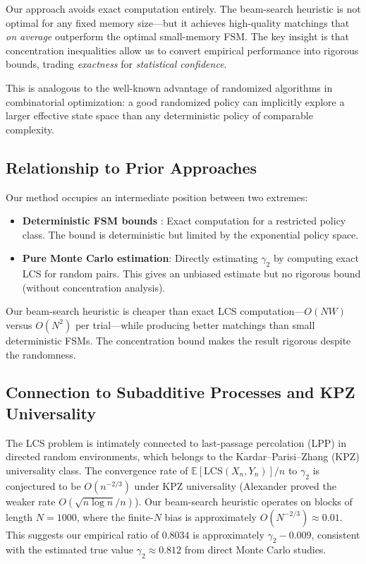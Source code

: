 \documentclass[11pt,a4paper]{article}
\theoremstyle{definition}
\newcommand{\E}{\mathbb{E}}
\newcommand{\LCS}{\mathrm{LCS}}
\begin{document}
Our approach avoids exact computation entirely. The beam-search heuristic is not
optimal for any fixed memory size---but it achieves high-quality matchings that
\emph{on average} outperform the optimal small-memory FSM. The key insight is
that concentration inequalities allow us to convert empirical performance into
rigorous bounds, trading \emph{exactness} for \emph{statistical confidence}.

This is analogous to the well-known advantage of randomized algorithms in
combinatorial optimization: a good randomized policy can implicitly explore a
larger effective state space than any deterministic policy of comparable
complexity.

\subsection{Relationship to Prior Approaches}

Our method occupies an intermediate position between two extremes:
\begin{itemize}
  \item \textbf{Deterministic FSM bounds} \citep{dancik1994,heineman2024}: Exact
    computation for a restricted policy class. The bound is deterministic but
    limited by the exponential policy space.
  \item \textbf{Pure Monte Carlo estimation}: Directly estimating $\gamma_2$ by
    computing exact LCS for random pairs. This gives an unbiased estimate but no
    rigorous bound (without concentration analysis).
\end{itemize}

Our beam-search heuristic is cheaper than exact LCS computation---$O(NW)$ versus
$O(N^2)$ per trial---while producing better matchings than small deterministic
FSMs. The concentration bound makes the result rigorous despite the randomness.

\subsection{Connection to Subadditive Processes and KPZ Universality}

The LCS problem is intimately connected to last-passage percolation (LPP) in
directed random environments, which belongs to the Kardar--Parisi--Zhang (KPZ)
universality class. The convergence rate of $\E[\LCS(X_n, Y_n)]/n$ to
$\gamma_2$ is conjectured to be $O(n^{-2/3})$ under KPZ universality
(Alexander \citep{alexander1994} proved the weaker rate
$O(\sqrt{n\log n}/n)$). Our
beam-search heuristic operates on blocks of length $N = 1000$, where the
finite-$N$ bias is approximately $O(N^{-2/3}) \approx 0.01$. This suggests our
empirical ratio of $0.8034$ is approximately $\gamma_2 - 0.009$, consistent
with the estimated true value $\gamma_2 \approx 0.812$ from direct Monte Carlo
studies.
\end{document}
